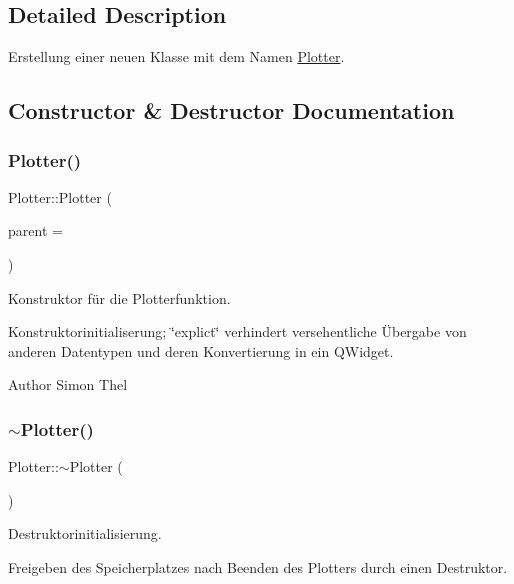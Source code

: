\subsection{Detailed Description}
Erstellung einer neuen Klasse mit dem Namen \hyperlink{class_plotter}{Plotter}. 

\subsection{Constructor \& Destructor Documentation}
\mbox{\label{class_plotter_a367b6890c36910a27ec710ac3693e64b}} 
\subsubsection{\texorpdfstring{Plotter()}{Plotter()}}
{\footnotesize\ttfamily Plotter\+::\+Plotter (\begin{DoxyParamCaption}\item[{Q\+Widget $\ast$}]{parent = {} }\end{DoxyParamCaption})\hspace{0.3cm}{\ttfamily [explicit]}}



Konstruktor für die Plotterfunktion. 

Konstruktorinitialiserung; \char`\"{}explict\char`\"{} verhindert versehentliche Übergabe von anderen Datentypen und deren Konvertierung in ein Q\+Widget. \begin{DoxyAuthor}{Author}
Simon Thel 
\end{DoxyAuthor}
\mbox{\label{class_plotter_acd0883f9597a6b3bfcca0fce926809a0}} 
\subsubsection{\texorpdfstring{$\sim$\+Plotter()}{~Plotter()}}
{\footnotesize\ttfamily Plotter\+::$\sim$\+Plotter (\begin{DoxyParamCaption}{ }\end{DoxyParamCaption})}



Destruktorinitialisierung. 

Freigeben des Speicherplatzes nach Beenden des Plotters durch einen Destruktor. 

